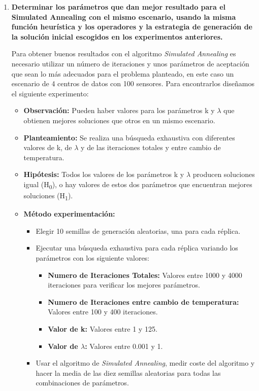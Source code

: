 \documentclass{article}
\begin{document}
\begin{enumerate}
  \item \textbf{Determinar los parámetros que dan mejor resultado para el Simulated Annealing con el mismo escenario, usando la misma función heurística y los operadores y la estrategia de generación de la solución inicial escogidos en los experimentos anteriores.}

  Para obtener buenos resultados con el algoritmo \textit{Simulated Annealing} es necesario utilizar un número de iteraciones y unos parámetros de aceptación que sean lo más adecuados para el problema planteado, en este caso un escenario de 4 centros de datos con 100 sensores. Para encontrarlos diseñamos el siguiente experimento:

  \begin{itemize}
    \item \textbf{Observación:} Pueden haber valores para los parámetros k y ${\lambda}$ que obtienen mejores soluciones que otros en un mismo escenario.
    \item \textbf{Planteamiento:} Se realiza una búsqueda exhaustiva con diferentes valores de k, de ${\lambda}$ y de las iteraciones totales y entre cambio de temperatura.
    \item \textbf{Hipótesis:} Todos los valores de los parámetros k y ${\lambda}$  producen soluciones igual (H\textsubscript{0}), o hay valores de estos dos parámetros que encuentran mejores soluciones (H\textsubscript{1}).
    \item \textbf{Método experimentación:} \begin{itemize}
        \item Elegir 10 semillas de generación aleatorias, una para cada réplica.
        \item Ejecutar una búsqueda exhaustiva para cada réplica variando los parámetros con los siguiente valores:
        \begin{itemize}
            \item \textbf{Numero de Iteraciones Totales:} Valores entre 1000 y 4000 iteraciones para verificar los mejores parámetros.
            \item \textbf{Numero de Iteraciones entre cambio de temperatura:} Valores entre 100 y 400 iteraciones.
            \item \textbf{Valor de k:} Valores entre 1 y 125.
            \item \textbf{Valor de ${\lambda}$:} Valores entre 0.001 y 1.
        \end{itemize}
        \item Usar el algoritmo de \textit{Simulated Annealing}, medir coste del algoritmo y hacer la media de las diez semillas aleatorias para todas las combinaciones de parámetros.
    \end{itemize}
  \end{itemize}


\end{enumerate}
\end{document}
